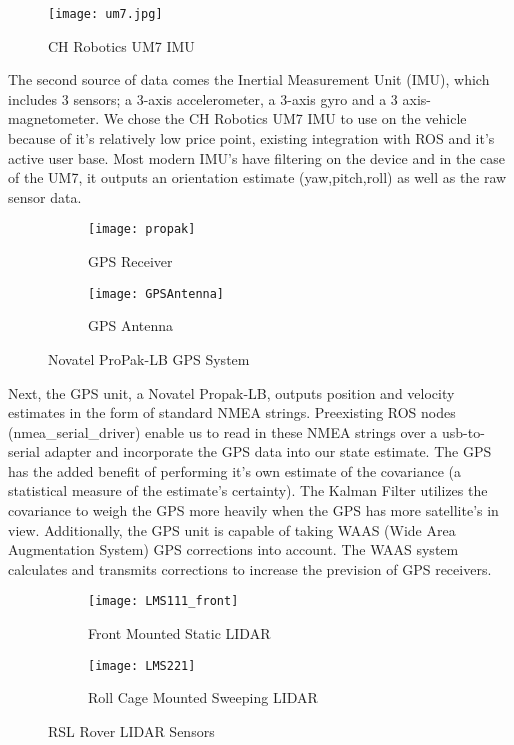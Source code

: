 \begin{figure}[H]
	\centerline{\texttt{[image: um7.jpg]}}
	\caption[]{CH Robotics UM7 IMU}
	\label{fig:imu}
\end{figure}

The second source of data comes the Inertial Measurement Unit (IMU), which includes 3 sensors; a 3-axis accelerometer, a 3-axis gyro and a 3 axis-magnetometer. We chose the CH Robotics UM7 IMU to use on the vehicle because of it's relatively low price point, existing integration with ROS and it's active user base. Most modern IMU's have filtering on the device and in the case of the UM7, it outputs an orientation estimate (yaw,pitch,roll) as well as the raw sensor data. 

\begin{figure}[H]
\centering
\begin{subfigure}{.5\textwidth}
	\centering
	\texttt{[image: propak]}
	\caption{GPS Receiver}
	\label{fig:sub1}
\end{subfigure}%
\begin{subfigure}{.5\textwidth}
	\centering
	\texttt{[image: GPSAntenna]}
	\caption{GPS Antenna}
	\label{fig:sub2}
\end{subfigure}
\caption{Novatel ProPak-LB GPS System}
\label{fig:test}
\end{figure}

Next, the GPS unit, a Novatel Propak-LB, outputs position and velocity estimates in the form of standard NMEA strings. Preexisting ROS nodes (nmea\_serial\_driver) enable us to read in these NMEA strings over a usb-to-serial adapter and incorporate the GPS data into our state estimate. The GPS has the added benefit of performing it's own estimate of the covariance (a statistical measure of the estimate's certainty). The Kalman Filter utilizes the covariance to weigh the GPS more heavily when the GPS has more satellite's in view. Additionally, the GPS unit is capable of taking WAAS (Wide Area Augmentation System) GPS corrections into account. The WAAS system calculates and transmits corrections to increase the prevision of GPS receivers.

\begin{figure}[H]
	\centering
	\begin{subfigure}{.5\textwidth}
		\centering
		\texttt{[image: LMS111\_front]}
		\caption{Front Mounted Static LIDAR}
		\label{fig:sub1}
	\end{subfigure}%
	\begin{subfigure}{.5\textwidth}
		\centering
		\texttt{[image: LMS221]}
		\caption{Roll Cage Mounted Sweeping LIDAR}
		\label{fig:sub2}
	\end{subfigure}
	\caption{RSL Rover LIDAR Sensors}
	\label{fig:lidar}
\end{figure}

